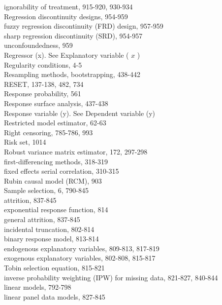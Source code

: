 \documentclass[10pt]{article}
\begin{document}
ignorability of treatment, 915-920, 930-934\\
Regression discontinuity designs, 954-959\\
fuzzy regression discontinuity (FRD) design, 957-959\\
sharp regression discontinuity (SRD), 954-957\\
unconfoundedness, 959\\
Regressor (x). See Explanatory variable ( $x$ )\\
Regularity conditions, 4-5\\
Resampling methods, bootstrapping, 438-442\\
RESET, 137-138, 482, 734\\
Response probability, 561\\
Response surface analysis, 437-438\\
Response variable (y). See Dependent variable (y)\\
Restricted model estimator, 62-63\\
Right censoring, 785-786, 993\\
Risk set, 1014\\
Robust variance matrix estimator, 172, 297-298\\
first-differencing methods, 318-319\\
fixed effects serial correlation, 310-315\\
Rubin causal model (RCM), 903\\
Sample selection, 6, 790-845\\
attrition, 837-845\\
exponential response function, 814\\
general attrition, 837-845\\
incidental truncation, 802-814\\
binary response model, 813-814\\
endogenous explanatory variables, 809-813, 817-819\\
exogenous explanatory variables, 802-808, 815-817\\
Tobin selection equation, 815-821\\
inverse probability weighting (IPW) for missing data, 821-827, 840-844\\
linear models, 792-798\\
linear panel data models, 827-845
\end{document}
